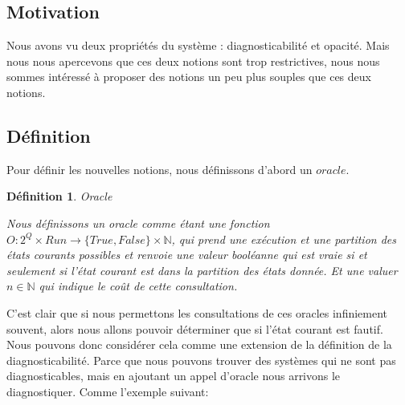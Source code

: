 \documentclass[a4paper,10pt]{article}
\newtheorem{mydef}{D\'efinition}
\begin{document}
\subsection{Motivation}

Nous avons vu deux propri\'et\'es du syst\`eme : diagnosticabilit\'e et opacit\'e. Mais nous nous apercevons que ces deux notions sont trop restrictives, nous nous sommes int\'eress\'e \`a proposer des notions un peu plus souples que ces deux notions.

\subsection{D\'efinition}

Pour d\'efinir les nouvelles notions, nous d\'efinissons d'abord un $oracle$.

\begin{mydef}{Oracle}

  Nous d\'efinissons un oracle comme \'etant une fonction $O: 2^Q\times Run \to \{True, False\} \times \mathbb{N}$, qui prend une ex\'ecution et une partition des \'etats courants possibles et renvoie une valeur bool\'eanne qui est vraie si et seulement si l'\'etat courant est dans la partition des \'etats donn\'ee. Et une valuer $n \in \mathbb{N}$ qui indique le co\^ut de cette consultation.

\end{mydef}

C'est clair que si nous permettons les consultations de ces oracles infiniement souvent, alors nous allons pouvoir d\'eterminer que si l'\'etat courant est fautif. Nous pouvons donc consid\'erer cela comme une extension de la d\'efinition de la diagnosticabilit\'e. Parce que nous pouvons trouver des syst\`emes qui ne sont pas diagnosticables, mais en ajoutant un appel d'oracle nous arrivons le diagnostiquer. Comme l'exemple suivant:

\begin{figure}[H]
  \begin{center}
  \end{center}
\end{figure}
\end{document}
